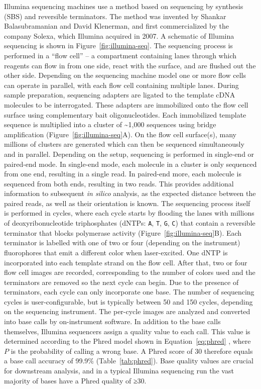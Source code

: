 \documentclass[11pt]{book}
\begin{document}
Illumina sequencing machines use a method based on sequencing by synthesis (SBS) and reversible terminators. The method was invented by Shankar Balasubramanian and David Klenerman, and first commercialized by the company Solexa, which Illumina acquired in 2007. A schematic of Illumina sequencing is shown in Figure~\ref{fig:illumina-seq}. The sequencing process is performed in a ``flow cell'' -- a compartment containing lanes through which reagents can flow in from one side, react with the surface, and are flushed out the other side. Depending on the sequencing machine model one or more flow cells can operate in parallel, with each flow cell containing multiple lanes. During sample preparation, sequencing adapters are ligated to the template cDNA molecules to be interrogated. These adapters are immobilized onto the flow cell surface using complementary bait oligonucleotides. Each immobilized template sequence is multiplied into a cluster of \textasciitilde1,000 sequences using bridge amplification (Figure~\ref{fig:illumina-seq}A). On the flow cell surface(s), many millions of clusters are generated which can then be sequenced simultaneously and in parallel. Depending on the setup, sequencing is performed in single-end or paired-end mode. In single-end mode, each molecule in a cluster is only sequenced from one end, resulting in a single read. In paired-end more, each molecule is sequenced from both ends, resulting in two reads. This provides additional information to subsequent \textit{in silico} analysis, as the expected distance between the paired reads, as well as their orientation is known. The sequencing process itself is performed in cycles, where each cycle starts by flooding the lanes with millions of deoxyribonucleotide triphosphates (dNTPs: \verb|A|, \verb|T|, \verb|G|, \verb|C|) that contain a reversible terminator that blocks polymerase activity (Figure~\ref{fig:illumina-seq}B). Each terminator is labelled with one of two or four (depending on the instrument) fluorophores that emit a different color when laser-excited. One dNTP is incorporated into each template strand on the flow cell. After that, two or four flow cell images are recorded, corresponding to the number of colors used and the terminators are removed so the next cycle can begin. Due to the presence of terminators, each cycle can only incorporate one base. The number of sequencing cycles is user-configurable, but is typically between 50 and 150 cycles, depending on the sequencing instrument. The per-cycle images are analyzed and converted into base calls by on-instrument software. In addition to the base calls themselves, Illumina sequencers assign a quality value to each call. This value is determined according to the Phred model shown in Equation~\ref{eq:phred} \cite{Ewing:1998a, Ewing:1998b}, where $P$ is the probability of calling a wrong base. A Phred score of 30 therefore equals a base call accuracy of 99.9\% (Table~\ref{tab:phred}). Base quality values are crucial for downstream analysis, and in a typical Illumina sequencing run the vast majority of bases have a Phred quality of ≥30.
\end{document}
